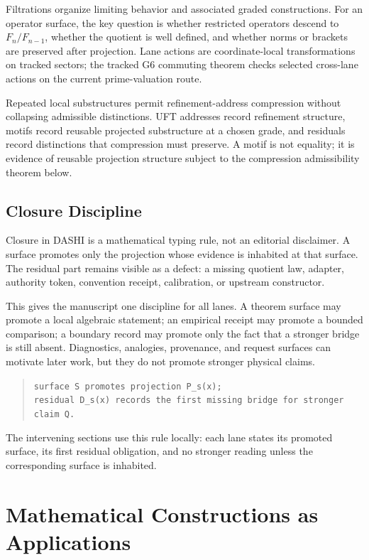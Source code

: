 \documentclass[11pt]{article}
\theoremstyle{definition}
\theoremstyle{plain}
\theoremstyle{remark}
\begin{document}
Filtrations organize limiting behavior and associated graded constructions.
For an operator surface, the key question is whether restricted operators
descend to \(F_n/F_{n-1}\), whether the quotient is well defined, and whether
norms or brackets are preserved after projection. Lane actions are
coordinate-local transformations on tracked sectors; the tracked G6 commuting
theorem checks selected cross-lane actions on the current prime-valuation
route.

Repeated local substructures permit refinement-address compression without
collapsing admissible distinctions. UFT addresses record refinement structure,
motifs record reusable projected substructure at a chosen grade, and residuals
record distinctions that compression must preserve. A motif is not equality; it
is evidence of reusable projection structure subject to the compression
admissibility theorem below.

\subsection{Closure Discipline}

Closure in DASHI is a mathematical typing rule, not an editorial disclaimer. A
surface promotes only the projection whose evidence is inhabited at that
surface. The residual part remains visible as a defect: a missing quotient
law, adapter, authority token, convention receipt, calibration, or upstream
constructor.

This gives the manuscript one discipline for all lanes. A theorem surface may
promote a local algebraic statement; an empirical receipt may promote a
bounded comparison; a boundary record may promote only the fact that a
stronger bridge is still absent. Diagnostics, analogies, provenance, and
request surfaces can motivate later work, but they do not promote stronger
physical claims.

\begin{quote}
\texttt{surface S promotes projection P\_s(x);}\\
\texttt{residual D\_s(x) records the first missing bridge for stronger claim Q.}
\end{quote}

The intervening sections use this rule locally: each lane states its promoted
surface, its first residual obligation, and no stronger reading unless the
corresponding surface is inhabited.

\section{Mathematical Constructions as Applications}
\end{document}
